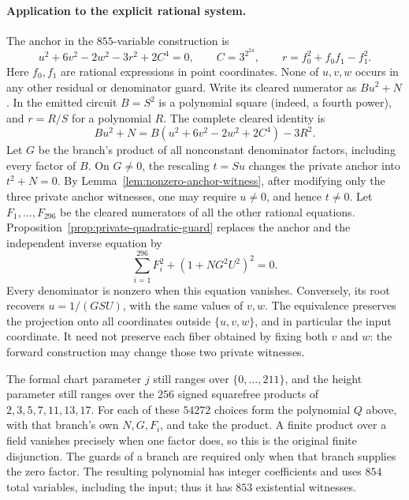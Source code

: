 \paragraph{Application to the explicit rational system.}
The anchor in the $855$-variable construction is
\[
 u^2+6v^2-2w^2-3r^2+2C^4=0,
 \qquad C=3^{2^{24}},\qquad
 r=f_0^2+f_0f_1-f_1^2.
\]
Here $f_0,f_1$ are rational expressions in point coordinates. None of
$u,v,w$ occurs in any other residual or denominator guard.
Write its cleared numerator as $Bu^2+N$. In the emitted circuit
$B=S^2$ is a polynomial square (indeed, a fourth power), and
$r=R/S$ for a polynomial $R$. The complete cleared identity is
\[
 Bu^2+N=B(u^2+6v^2-2w^2+2C^4)-3R^2.
\]
Let $G$ be the branch's product of all nonconstant denominator factors,
including every factor of $B$. On $G\ne0$, the rescaling $t=Su$
changes the private anchor into $t^2+N=0$. By
Lemma~\ref{lem:nonzero-anchor-witness}, after modifying only the three
private anchor witnesses, one may require $u\ne0$, and hence $t\ne0$.
Let $F_1,\ldots,F_{296}$ be the cleared numerators of all the other
rational equations. Proposition~\ref{prop:private-quadratic-guard}
replaces the anchor and the independent inverse equation by
\[
 \sum_{i=1}^{296}F_i^2+(1+NG^2U^2)^2=0.
\]
Every denominator is nonzero when this equation vanishes. Conversely,
its root recovers $u=1/(GSU)$, with the same values of $v,w$.
The equivalence preserves the projection onto all coordinates outside
$\{u,v,w\}$, and in particular the input coordinate. It need not
preserve each fiber obtained by fixing both $v$ and $w$: the forward
construction may change those two private witnesses.

The formal chart parameter $j$ still ranges over $\{0,\ldots,211\}$,
and the height parameter still ranges over the $256$ signed squarefree
products of $2,3,5,7,11,13,17$. For each of these $54272$ choices form
the polynomial $Q$ above, with that branch's own $N,G,F_i$, and take
the product. A finite product over a field vanishes precisely when
one factor does, so this is the original finite disjunction.
The guards of a branch are required only when that branch supplies
the zero factor. The resulting polynomial has integer coefficients
and uses $854$ total variables, including the input; thus it has
$853$ existential witnesses.

